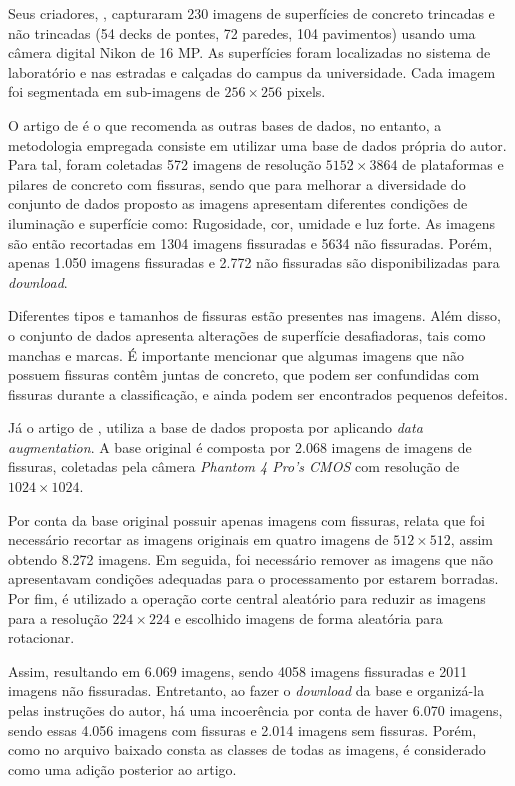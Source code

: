 Seus criadores, , capturaram 230 imagens de superfícies de concreto trincadas e não trincadas (54 decks de pontes, 72 paredes, 104 pavimentos) usando uma câmera digital Nikon de 16 MP. 
As superfícies foram localizadas no sistema de laboratório  e nas estradas e calçadas do campus da universidade. 
Cada imagem foi segmentada em sub-imagens de $256 \times 256$ pixels.

O artigo de  é o que recomenda as outras bases de dados, no entanto, a metodologia empregada consiste em utilizar uma base de dados própria do autor.
Para tal, foram coletadas 572 imagens de resolução $5152 \times 3864$ de plataformas e pilares de concreto com fissuras, sendo que para melhorar a diversidade do conjunto de dados proposto as imagens apresentam diferentes condições de iluminação e superfície como: Rugosidade, cor, umidade e luz forte. 
As imagens são então recortadas em 1304 imagens fissuradas e 5634 não fissuradas.
Porém, apenas 1.050 imagens fissuradas e 2.772 não fissuradas são disponibilizadas para \textit{download}.

Diferentes tipos e tamanhos de fissuras estão presentes nas imagens. 
Além disso, o conjunto de dados apresenta alterações de superfície desafiadoras, tais como manchas e marcas. 
É importante mencionar que algumas imagens que não possuem fissuras contêm juntas de concreto, que podem ser confundidas com fissuras durante a classificação, e ainda podem ser encontrados pequenos defeitos.

Já o artigo de , utiliza a base de dados proposta por  aplicando \textit{data augmentation}.
A base original é composta por 2.068 imagens de imagens de fissuras, coletadas pela câmera \textit{Phantom 4 Pro's CMOS} com resolução de $1024 \times 1024$.

Por conta da base original possuir apenas imagens com fissuras,  relata que foi necessário recortar as imagens originais em quatro imagens de $512 \times 512$, assim obtendo 8.272 imagens.
Em seguida, foi necessário remover as imagens que não apresentavam condições adequadas para o processamento por estarem borradas. 
Por fim, é utilizado a operação corte central aleatório para reduzir as imagens para a resolução $224 \times 224$ e escolhido imagens de forma aleatória para rotacionar.

Assim, resultando em 6.069 imagens, sendo 4058 imagens fissuradas e 2011 imagens não fissuradas.
Entretanto, ao fazer o \textit{download} da base e organizá-la pelas instruções do autor, há uma incoerência por conta de haver 6.070 imagens, sendo essas 4.056 imagens com fissuras e 2.014 imagens sem fissuras.
Porém, como no arquivo baixado consta as classes de todas as imagens, é considerado como uma adição posterior ao artigo.

